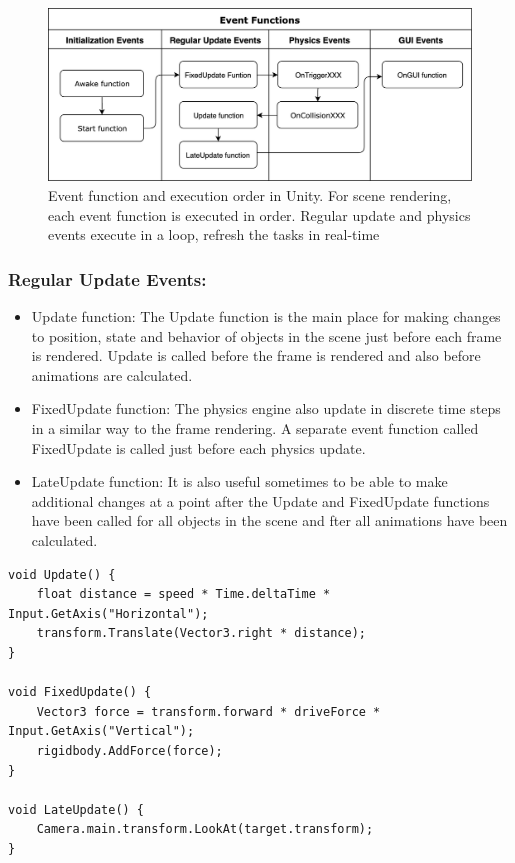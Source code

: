 \begin{figure}[h]
	\centering
	\includegraphics[width=\textwidth]{Figures/Section3_Eventfunction.png}
	\caption{Event function and execution order in Unity. For scene rendering, each event function is executed in order. Regular update and physics events execute in a loop, refresh the tasks in real-time}
	\label{fig: event_function}
\end{figure}



\subsubsection*{Regular Update Events: }
\begin{itemize}
	\item Update function: The Update function is the main place for making changes to position, state and behavior of objects in the scene just before each frame is rendered. Update is called before the frame is rendered and also before animations are calculated.
	\item FixedUpdate function: The physics engine also update in discrete time steps in a similar way to the frame rendering. A separate event function called FixedUpdate is called just before each physics update.
	\item LateUpdate function: It is also useful sometimes to be able to make additional changes at a point after the Update and FixedUpdate functions have been called for all objects in the scene and fter all animations have been calculated.
\end{itemize}

\begin{lstlisting}[caption=Regular Update Events Functions]
void Update() {
	float distance = speed * Time.deltaTime * Input.GetAxis("Horizontal");
	transform.Translate(Vector3.right * distance);
}

void FixedUpdate() {
	Vector3 force = transform.forward * driveForce * Input.GetAxis("Vertical");
	rigidbody.AddForce(force);
}

void LateUpdate() {
	Camera.main.transform.LookAt(target.transform);
}
\end{lstlisting}


